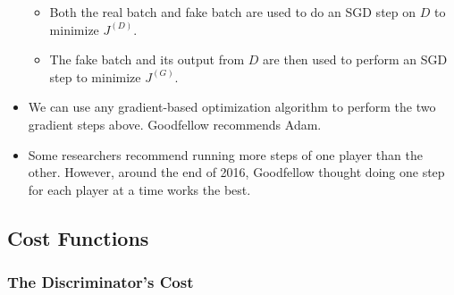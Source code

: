 \documentclass[10pt]{article}
\begin{document}
\begin{itemize}
\begin{itemize}
      \item Both the real batch and fake batch are used to do an SGD step on $D$ to minimize $J^{(D)}$.

      \item The fake batch and its output from $D$ are then used to perform an SGD step to minimize $J^{(G)}$.
    \end{itemize}

    \item We can use any gradient-based optimization algorithm to perform the two gradient steps above. Goodfellow recommends Adam.

    \item Some researchers recommend running more steps of one player than the other. However, around the end of 2016, Goodfellow thought doing one step for each player at a time works the best.
  \end{itemize}

  \subsection{Cost Functions}

  \subsubsection{The Discriminator's Cost}  
\end{document}
